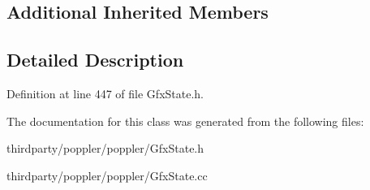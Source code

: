 \subsection*{Additional Inherited Members}


\subsection{Detailed Description}


Definition at line 447 of file Gfx\+State.\+h.



The documentation for this class was generated from the following files\+:\begin{DoxyCompactItemize}
\item 
thirdparty/poppler/poppler/Gfx\+State.\+h\item 
thirdparty/poppler/poppler/Gfx\+State.\+cc\end{DoxyCompactItemize}
